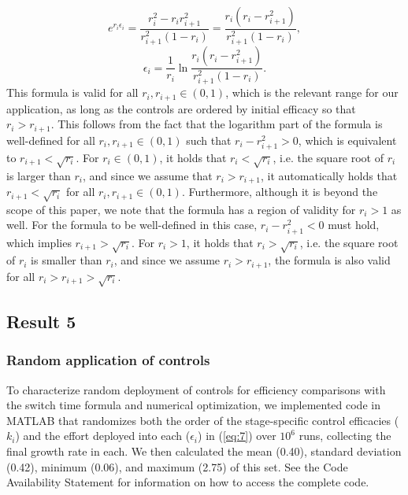 \documentclass[onecolumn]{article}
\begin{document}
\begin{equation} e^{r_i\epsilon_i} = \frac{r_i^2 - r_i r_{i+1}^2}{r_{i+1}^2(1 - r_i)} = \frac{r_i(r_i - r_{i+1}^2)}{r_{i+1}^2(1 - r_i)}, \end{equation}
\begin{equation} \epsilon_i = \frac{1}{r_i} \ln \frac{r_i(r_i - r_{i+1}^2)}{r_{i+1}^2(1 - r_i)}. \end{equation}
This formula is valid for all $r_i, r_{i+1} \in (0,1)$, which is the relevant range for our application, as long as the controls are ordered by initial efficacy so that $r_i > r_{i+1}$. This follows from the fact that the logarithm part of the formula is well-defined for all $r_i, r_{i+1} \in (0,1)$ such that $r_i - r_{i+1}^2 > 0$, which is equivalent to $r_{i+1} < \sqrt{r_i}$. For $r_i \in (0,1)$, it holds that $r_i < \sqrt{r_i}$, i.e. the square root of $r_i$ is larger than $r_i$, and since we assume that $r_i > r_{i+1}$, it automatically holds that $r_{i+1} < \sqrt{r_i}$ for all $r_i, r_{i+1} \in (0,1)$.
Furthermore, although it is beyond the scope of this paper, we note that the formula has a region of validity for $r_i > 1$ as well. For the formula to be well-defined in this case, $r_i - r_{i+1}^2 < 0$ must hold, which implies $r_{i+1} > \sqrt{r_i}$. For $r_i > 1$, it holds that $r_i > \sqrt{r_i}$, i.e. the square root of $r_i$ is smaller than $r_i$, and since we assume $r_i > r_{i+1}$, the formula is also valid for all $r_i > r_{i+1} > \sqrt{r_i}$.

\subsection*{Result 5}
\subsubsection*{Random application of controls}
To characterize random deployment of controls for efficiency comparisons with the switch time formula and numerical optimization, we implemented code in MATLAB that randomizes both the order of the stage-specific control efficacies ($k_i$) and the effort deployed into each ($\epsilon_i$) in (\ref{eq:7}) over $10^6$ runs, collecting the final growth rate in each. We then calculated the mean (0.40), standard deviation (0.42), minimum (0.06), and maximum (2.75) of this set. See the Code Availability Statement for information on how to access the complete code.
\end{document}
